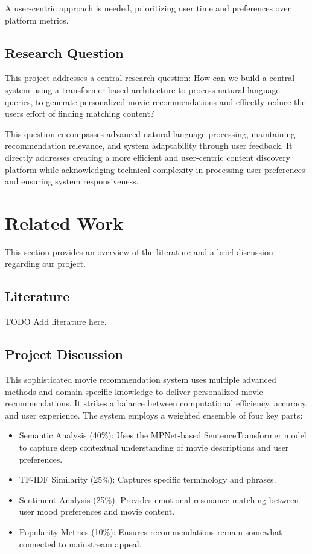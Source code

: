 \documentclass[12pt,a4paper]{article}
\begin{document}
  \noindent A user-centric approach is needed, prioritizing user time and preferences over platform metrics.

  \subsection{Research Question}

  This project addresses a central research question:
  How can we build a central system using a transformer-based architecture to process natural language queries,
  to generate personalized movie recommendations and efficetly reduce the users effort of finding matching content?

  \noindent This question encompasses advanced natural language processing, maintaining recommendation relevance, and system
  adaptability through user feedback. It directly addresses creating a more efficient and user-centric content discovery
  platform while acknowledging technical complexity in processing user preferences and ensuring system responsiveness.


  \section{Related Work}

  This section provides an overview of the literature and a brief discussion regarding our project.

  \subsection{Literature}

  TODO Add literature here.

  \subsection{Project Discussion}

  This sophisticated movie recommendation system uses multiple advanced methods and domain-specific knowledge
  to deliver personalized movie recommendations. It strikes a balance between computational efficiency, accuracy, and
  user experience.
  The system employs a weighted ensemble of four key parts:
  \begin{itemize}
    \item Semantic Analysis (40\%): Uses the MPNet-based SentenceTransformer model to capture deep contextual understanding of movie descriptions and user preferences.
    \item TF-IDF Similarity (25\%): Captures specific terminology and phrases.
    \item Sentiment Analysis (25\%): Provides emotional resonance matching between user mood preferences and movie content.
    \item Popularity Metrics (10\%): Ensures recommendations remain somewhat connected to mainstream appeal.
  \end{itemize}
\end{document}
